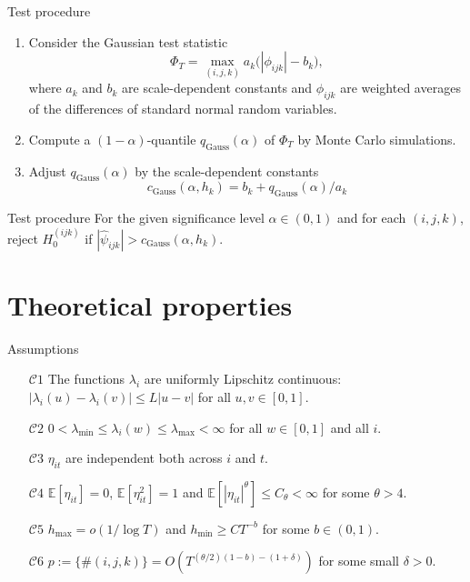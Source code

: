 \documentclass[10pt, handout]{beamer}
\newcommand{\E}{\mathbb{E}}
\begin{document}
\begin{frame}[label = frame_test]{Test procedure}

\begin{enumerate}
	\item Consider the Gaussian test statistic 
	\vspace{-2mm} \[ \Phi_T = \max_{(i,j,k)} a_k \big( |\phi_{ijk}| - b_k \big), \] where $a_k$ and $b_k$ are scale-dependent constants and $\phi_{ijk}$ are weighted averages of the differences of standard normal random variables.\pause
	\item Compute a $(1-\alpha)$-quantile $q_{\text{Gauss}} (\alpha)$ of $\Phi_T$ by Monte Carlo simulations.\pause
	\item Adjust $q_{ \text{Gauss}} (\alpha)$ by the scale-dependent constants \vspace{-2mm}  \[c_{\text{Gauss}}(\alpha,h_k) = b_k + q_{\text{Gauss}}(\alpha)/a_k\] \pause
\end{enumerate}
\vspace{-5mm}
\begin{block}{Test procedure}
For the given significance level $\alpha \in (0,1)$ and for each $(i,j,k)$, reject $H_0^{(ijk)}$ if $|\widehat{\psi}_{ijk}| > c_{\text{Gauss}}(\alpha,h_k)$.

\end{block}
\end{frame}



\section{Theoretical properties}
\begin{frame}{Assumptions}
\begin{itemize}
\item[$\mathcal{C}1$] \label{C1} The functions $\lambda_i$ are uniformly Lipschitz continuous: $|\lambda_i(u) - \lambda_i(v)| \le L |u-v|$ for all $u, v \in [0,1]$.
\item[$\mathcal{C}2$] \label{C2} $0 < \lambda_{\min} \le \lambda_i(w) \le \lambda_{\max} < \infty$ for all $w \in [0, 1]$ and all $i$. 
\item[$\mathcal{C}3$] \label{C3} $\eta_{it}$ are independent both across $i$ and $t$.
\item[$\mathcal{C}4$] \label{C4} $\E[\eta_{it}] = 0$, $\E[\eta_{it}^2] = 1$ and $\E[|\eta_{it}|^\theta] \le C_\theta < \infty$ for some $\theta > 4$. 
\item[$\mathcal{C}5$] \label{C5} $h_{\max} = o(1/\log T)$ and $h_{\min} \ge CT^{-b}$ for some $b \in (0,1)$.
\item[$\mathcal{C}6$] \label{C6} $p := \{ \# (i, j, k) \} = O(T^{(\theta/2)(1-b)-(1+\delta)})$ for some small $\delta > 0$.
\end{itemize}
\end{frame}
\end{document}
